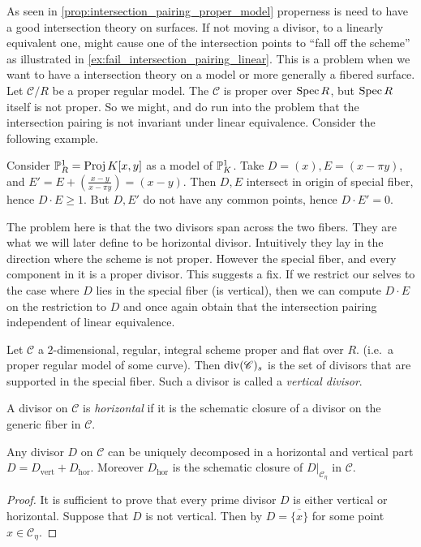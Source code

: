 
As seen in \cref{prop:intersection_pairing_proper_model} properness is need to have a good intersection theory on surfaces. 
If not moving a divisor, to a linearly equivalent one, might cause one of the intersection points to ``fall off the scheme'' as illustrated in \cref{ex:fail_intersection_pairing_linear}.
This is a problem when we want to have a intersection theory on a model or more generally a fibered surface. 
Let $\mathscr C  / R $ be a proper regular model. 
The $\mathscr C$ is proper over $\operatorname{Spec} R$, but $\operatorname{Spec} R$ itself is not proper. 
So we might, and do run into the problem that the intersection pairing is not invariant under linear equivalence. Consider the following example.

\begin{example}\label{ex:first_model}
	Consider $\mathbb{P}^{1}_R = \operatorname{Proj} K[x, y]$ as a model of $\mathbb{P}^{1}_K$. 
	Take $D = (x), E = (x-\pi y )$, and $E' = E + (\frac{x-y}{x-\pi y})= (x - y)$.
	Then  $D, E$ intersect in origin of special fiber, hence $D\cdot E \ge 1$. 
	But $D, E'$ do not have any common points, hence $D \cdot E' = 0$. 
\end{example}

The problem here is that the two divisors span across the two fibers.
They are what we will later define to be horizontal divisor. 
Intuitively they lay in the direction where the scheme is not proper. 
However the special fiber, and every component in it is a proper divisor. 
This suggests a fix.
If we restrict our selves to the case where $D$ lies in the special fiber (is vertical), then we can compute $D\cdot E$ on the restriction to $D$ and once again obtain that the intersection pairing independent of linear equivalence. 

\begin{definition}\label{def:vertical_divisor}
	Let $\mathscr{C}$ a $2$-dimensional, regular, integral scheme proper and flat over $R$.  (i.e.\ a proper regular model of some curve). 
	Then $\operatorname{div}(\mathscr{C})_s$ is the set of divisors that are supported in the special fiber. 
	Such a divisor is called a \emph{vertical divisor}.
\end{definition}
\begin{definition}\label{def:horizontal_divisor}
	A divisor on $\mathscr{C} $ is \emph{horizontal} if it is the schematic closure of a divisor on the generic fiber in $\mathscr C$. 
\end{definition}
\begin{lemma}\label{lem:decomponsition_horizontal_vertical}
	Any divisor $D$ on $\mathscr{C}$ can be uniquely decomposed in a horizontal and vertical part $D =  D_\text{vert}  + D_\text{hor}$. 
	Moreover $D_\text{hor} $ is the schematic closure of $D|_{\mathscr C_\eta}$ in $\mathscr C$.
\end{lemma}
\begin{proof}
	It is sufficient to prove that every prime divisor $D$ is either vertical or horizontal.
	Suppose that $D$ is not vertical. 
	Then by \cite[prop. 8.3.4]{liuAlgebraicGeometryArithmetic2002} $D = \overline{\{x\} }$ for some point $x \in \mathscr{C} _\eta$.
\end{proof}

